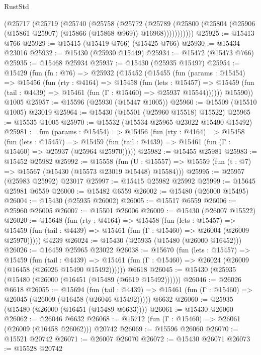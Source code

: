 \begin{lexlean}{RustStd}
\begin{coremodule}
        (@25717
          (@25719
            (@25740
              (@25758
                (@25772
                  (@25789
                    (@25800 (@25804 (@25906 (@15861 @25907) (@15866 (@15868 @969)) @16968)))))))))))
@25925 := @15413 @766
@25929 := @15415 (@15419 @766) (@15425 @766)
@25930 := @15434 @23016
@25932 := @15430 (@25930 @15449)
@25934 := @15472 (@15473 @766)
@25935 := @15468 @25934
@25937 := @15430 (@25935 @15497)
@25954 := @15429
    (fun (fn : @76) =>
    @25932
      (@15452
        (@15455
          (fun (params : @15454) =>
          @15456
            (fun (rty : @4164) =>
            @15458
              (fun (lets : @15457) =>
              @15459 (fun (tail : @4439) => @15461 (fun (Γ : @15460) => @25937 @15544))))))
        @15590))
    @1005
@25957 := @15596 (@25930 (@15447 @1005))
@25960 := @15509 (@15510 @1005) @23019
@25964 := @15430 (@15501 (@25960 @15518) @15522)
@25965 := @15535 @1005
@25970 := @15532 (@15534 @25965 @23022 @15490 @15492)
@25981 := fun (params : @15454) =>
  @15456
    (fun (rty : @4164) =>
    @15458
      (fun (lets : @15457) =>
      @15459 (fun (tail : @4439) => @15461 (fun (Γ : @15460) => @25937 (@25964 @25970)))))
@25982 := @15455 @25981
@25983 := @15452 @25982
@25992 := @15558
    (fun (U : @15557) => @15559 (fun (t : @7) => @15567 (@15430 (@15573 @23019 @15448) @15584)))
@25995 := @25957 (@25983 @25992) @23017
@25997 := @15415 @25982 @25992
@25999 := @15645 @25981 @6559
@26000 := @15482 @6559
@26002 := @15480 (@26000 @15495)
@26004 := @15430 (@25935 @26002)
@26005 := @15517 @6559
@26006 := @25960 @26005
@26007 := @15501 @26006
@26009 := @15430 (@26007 @15522)
@26020 := @15648
    (fun (rty : @4164) =>
    @15458
      (fun (lets : @15457) =>
      @15459 (fun (tail : @4439) => @15461 (fun (Γ : @15460) => @26004 (@26009 @25970)))))
    @4239
@26024 := @15430 (@25935 (@15480 (@26000 @16452)))
@26026 := @16459 @25965 @23022
@26038 := @15670
    (fun (lets : @15457) =>
    @15459
      (fun (tail : @4439) =>
      @15461 (fun (Γ : @15460) => @26024 (@26009 (@16458 (@26026 @15490 @15492))))))
    @6618
@26045 := @15430 (@25935 (@15480 (@26000 (@16451 (@15489 (@6619 @15492))))))
@26046 := @26026 @6618
@26055 := @15694
    (fun (tail : @4439) => @15461 (fun (Γ : @15460) => @26045 (@26009 (@16458 (@26046 @15492)))))
    @6632
@26060 := @25935 (@15480 (@26000 (@16451 (@15489 @6633))))
@26061 := @15430 @26060
@26062 := @26046 @6632
@26068 := @15712 (fun (Γ : @15460) => @26061 (@26009 (@16458 @26062))) @20742
@26069 := @15596 @26060
@26070 := @15521 @20742
@26071 := @26007 @26070
@26072 := @15430 @26071
@26073 := @15528 @20742

\end{coremodule}
\end{lexlean}
